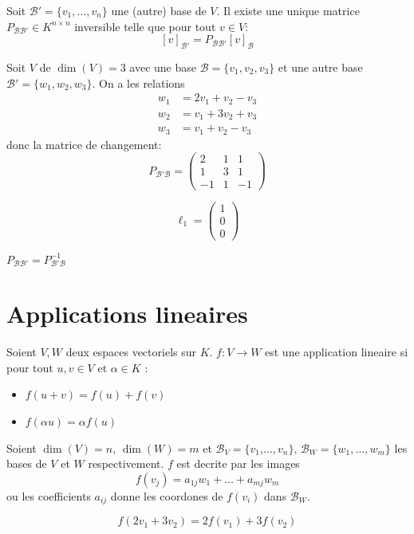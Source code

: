 \begin{definition}
Soit $\mathscr{B}'=\{ v_{1},\dots,v_{n} \}$ une (autre) base de $V$. Il existe une unique matrice $P_{\mathscr{B}\mathscr{B}'}\in K^{n\times n}$ inversible telle que  pour tout $v\in V$:
$$
[v]_{\mathscr{B'}}=P_{\mathscr{B}\mathscr{B}'}[v]_{\mathscr{B}}
$$
\end{definition}
\begin{example}
Soit $V$ de $\dim(V)=3$ avec une base $\mathscr{B}=\{ v_{1},v_{2},v_{3} \}$ et une autre base $\mathscr{B}'=\{ w_{1},w_{2},w_{3} \}$. On a les relations
\begin{align*}
w_{1} & =2v_{1}+v_{2}-v_{3} \\
w_{2} & =v_{1}+3v_{2}+v_{3} \\
w_{3} & =v_{1}+v_{2}-v_{3}
\end{align*}
donc la matrice de changement:
$$
P_{\mathscr{B}'\mathscr{B}}=\begin{pmatrix}
2 & 1 & 1 \\
1 & 3 & 1 \\
-1 & 1 & -1 
\end{pmatrix}
$$
\end{example}
\begin{notation}
$$
\boldsymbol{\ell}_{1}=\begin{pmatrix}
1 \\ 0\\0
\end{pmatrix}
$$
\end{notation}
\begin{remark}
$P_{\mathscr{B}\mathscr{B}'}=P_{\mathscr{B}'\mathscr{B}}^{-1}$
\end{remark}
\section{Applications lineaires}
Soient $V,W$ deux espaces vectoriels sur $K$. $f:V\to W$ est une application lineaire si pour tout $u,v\in V$ et $\alpha \in K$ :
\begin{itemize}
\item $f(u+v)=f(u)+f(v)$
\item $f(\alpha u)=\alpha f(u)$
\end{itemize}
Soient $\dim(V)=n$, $\dim(W)=m$ et $\mathscr{B}_{V}=\{ v_{1}$,$\dots,v_{n} \}$, $\mathscr{B}_{W}=\{ w_{1},\dots,w_{m} \}$ les bases de $V$ et $W$ respectivement. $f$ est decrite par les images $$f(v_{j})=a_{1j}w_{1}+\dots+a_{mj}w_{m}$$ ou les coefficients $a_{ij}$ donne les coordones de $f(v_{i})$ dans $\mathscr{B}_{W}$.
\begin{example}
$$
f(2v_{1}+3v_{2})=2f(v_{1})+3f(v_{2})
$$
\end{example}

